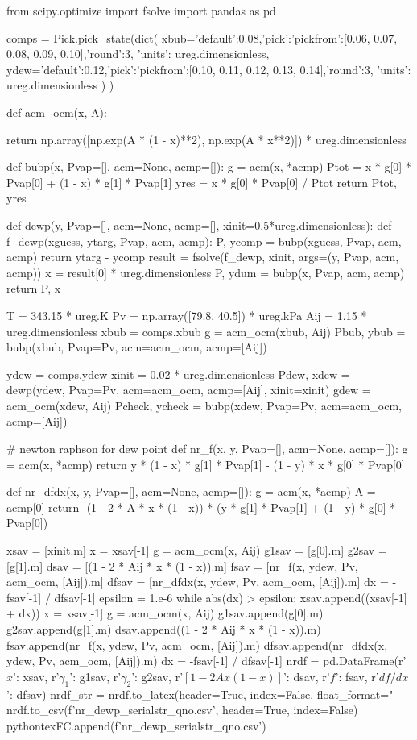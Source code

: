 \begin{pycode}
from scipy.optimize import fsolve
import pandas as pd

comps = Pick.pick_state(dict(
    xbub={'default':0.08,'pick':{'pickfrom':[0.06, 0.07, 0.08, 0.09, 0.10],'round':3}, 'units': ureg.dimensionless},
    ydew={'default':0.12,'pick':{'pickfrom':[0.10, 0.11, 0.12, 0.13, 0.14],'round':3}, 'units': ureg.dimensionless}
    )
)

def acm_ocm(x, A):

    return np.array([np.exp(A * (1 - x)**2), np.exp(A * x**2)]) * ureg.dimensionless

def bubp(x, Pvap=[], acm=None, acmp=[]):
    g = acm(x, *acmp)
    Ptot = x * g[0] * Pvap[0] + (1 - x) * g[1] * Pvap[1]
    yres = x * g[0] * Pvap[0] / Ptot
    return Ptot, yres

def dewp(y, Pvap=[], acm=None, acmp=[], xinit=0.5*ureg.dimensionless):
    def f_dewp(xguess, ytarg, Pvap, acm, acmp):
        P, ycomp = bubp(xguess, Pvap, acm, acmp)
        return ytarg - ycomp
    result = fsolve(f_dewp, xinit, args=(y, Pvap, acm, acmp))
    x = result[0] * ureg.dimensionless
    P, ydum = bubp(x, Pvap, acm, acmp)
    return P, x

T = 343.15 * ureg.K
Pv = np.array([79.8, 40.5]) * ureg.kPa
Aij = 1.15 * ureg.dimensionless
xbub = comps.xbub
g = acm_ocm(xbub, Aij)
Pbub, ybub = bubp(xbub, Pvap=Pv, acm=acm_ocm, acmp=[Aij])

ydew = comps.ydew
xinit = 0.02 * ureg.dimensionless
Pdew, xdew = dewp(ydew, Pvap=Pv, acm=acm_ocm, acmp=[Aij], xinit=xinit)
gdew = acm_ocm(xdew, Aij)
Pcheck, ycheck = bubp(xdew, Pvap=Pv, acm=acm_ocm, acmp=[Aij])

# newton raphson for dew point
def nr_f(x, y, Pvap=[], acm=None, acmp=[]):
    g = acm(x, *acmp)
    return y * (1 - x) * g[1] * Pvap[1] - (1 - y) * x * g[0] * Pvap[0]

def nr_dfdx(x, y, Pvap=[], acm=None, acmp=[]):
    g = acm(x, *acmp)
    A = acmp[0]
    return -(1 - 2 * A * x * (1 - x)) * (y * g[1] * Pvap[1] + (1 - y) * g[0] * Pvap[0])

xsav = [xinit.m]
x = xsav[-1]
g = acm_ocm(x, Aij)
g1sav = [g[0].m]
g2sav = [g[1].m]
dsav = [(1 - 2 * Aij * x * (1 - x)).m]
fsav = [nr_f(x, ydew, Pv, acm_ocm, [Aij]).m]
dfsav = [nr_dfdx(x, ydew, Pv, acm_ocm, [Aij]).m]
dx = -fsav[-1] / dfsav[-1]
epsilon = 1.e-6
while abs(dx) > epsilon:
    xsav.append((xsav[-1] + dx))
    x = xsav[-1]
    g = acm_ocm(x, Aij)
    g1sav.append(g[0].m)
    g2sav.append(g[1].m)
    dsav.append((1 - 2 * Aij * x * (1 - x)).m)
    fsav.append(nr_f(x, ydew, Pv, acm_ocm, [Aij]).m)
    dfsav.append(nr_dfdx(x, ydew, Pv, acm_ocm, [Aij]).m)
    dx = -fsav[-1] / dfsav[-1]
nrdf = pd.DataFrame({r'$x$': xsav, r'$\gamma_1$': g1sav, r'$\gamma_2$': g2sav, r'$[1-2Ax(1-x)]$': dsav, r'$f$': fsav, r'$df/dx$': dfsav})
nrdf_str = nrdf.to_latex(header=True, index=False, float_format="%
nrdf.to_csv(f'nr_dewp_{serialstr}_{qno}.csv', header=True, index=False)
pythontexFC.append(f'nr_dewp_{serialstr}_{qno}.csv')


\end{pycode}
